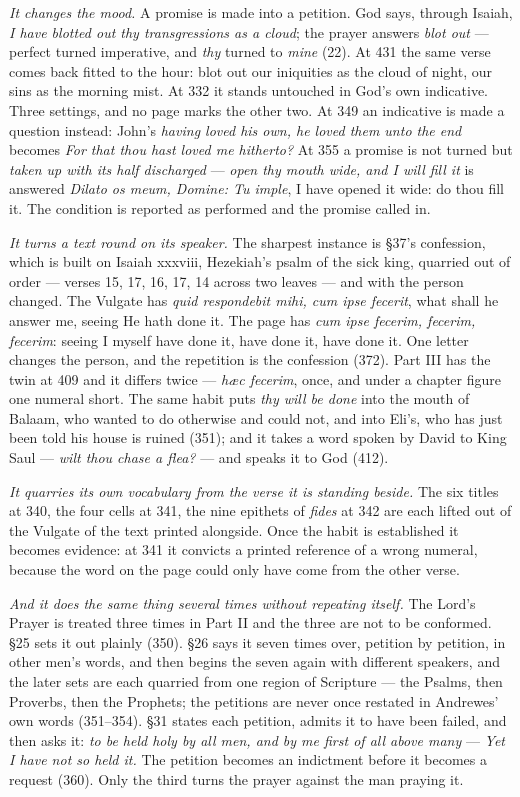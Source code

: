 \emph{It changes the mood.} A promise is made into a petition. God says, through
Isaiah, \emph{I have blotted out thy transgressions as a cloud}; the prayer answers
\emph{blot out} --- perfect turned imperative, and \emph{thy} turned to \emph{mine}
(22). At 431 the same verse comes back fitted to the hour: blot out our iniquities
as the cloud of night, our sins as the morning mist. At 332 it stands untouched in
God's own indicative. Three settings, and no page marks the other two. At 349 an
indicative is made a question instead: John's \emph{having loved his own, he loved
them unto the end} becomes \emph{For that thou hast loved me hitherto?} At 355 a
promise is not turned but \emph{taken up with its half discharged} --- \emph{open
thy mouth wide, and I will fill it} is answered \emph{Dilato os meum, Domine: Tu
imple}, I have opened it wide: do thou fill it. The condition is reported as
performed and the promise called in.

\emph{It turns a text round on its speaker.} The sharpest instance is §37's
confession, which is built on Isaiah xxxviii, Hezekiah's psalm of the sick king,
quarried out of order --- verses 15, 17, 16, 17, 14 across two leaves --- and with
the person changed. The Vulgate has \emph{quid respondebit mihi, cum ipse fecerit},
what shall he answer me, seeing He hath done it. The page has \emph{cum ipse
fecerim, fecerim, fecerim}: seeing I myself have done it, have done it, have done
it. One letter changes the person, and the repetition is the confession (372).
Part III has the twin at 409 and it differs twice --- \emph{hæc fecerim}, once, and
under a chapter figure one numeral short. The same habit puts \emph{thy will be
done} into the mouth of Balaam, who wanted to do otherwise and could not, and into
Eli's, who has just been told his house is ruined (351); and it takes a word spoken
by David to King Saul --- \emph{wilt thou chase a flea?} --- and speaks it to God
(412).

\emph{It quarries its own vocabulary from the verse it is standing beside.} The six
titles at 340, the four cells at 341, the nine epithets of \emph{fides} at 342 are
each lifted out of the Vulgate of the text printed alongside. Once the habit is
established it becomes evidence: at 341 it convicts a printed reference of a wrong
numeral, because the word on the page could only have come from the other verse.

\emph{And it does the same thing several times without repeating itself.} The
Lord's Prayer is treated three times in Part II and the three are not to be
conformed. §25 sets it out plainly (350). §26 says it seven times over, petition by
petition, in other men's words, and then begins the seven again with different
speakers, and the later sets are each quarried from one region of Scripture --- the
Psalms, then Proverbs, then the Prophets; the petitions are never once restated in
Andrewes' own words (351--354). §31 states each petition, admits it to have been
failed, and then asks it: \emph{to be held holy by all men, and by me first of all
above many} --- \emph{Yet I have not so held it.} The petition becomes an
indictment before it becomes a request (360). Only the third turns the prayer
against the man praying it.

